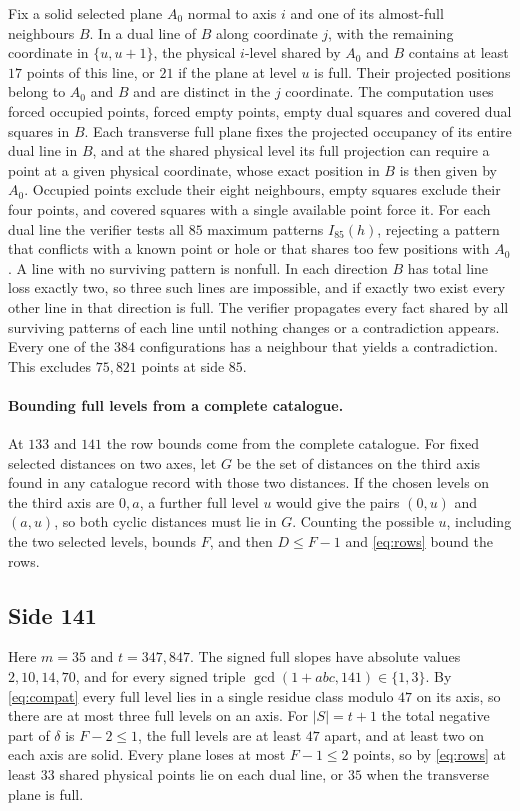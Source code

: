 \documentclass[11pt,colorlinks]{charlie}
\begin{document}
Fix a solid selected plane $A_0$ normal to axis $i$ and one of its almost-full neighbours $B$. In a dual line of $B$ along coordinate $j$, with the remaining coordinate in $\{u,u+1\}$, the physical $i$-level shared by $A_0$ and $B$ contains at least $17$ points of this line, or $21$ if the plane at level $u$ is full. Their projected positions belong to $A_0$ and $B$ and are distinct in the $j$ coordinate. The computation uses forced occupied points, forced empty points, empty dual squares and covered dual squares in $B$. Each transverse full plane fixes the projected occupancy of its entire dual line in $B$, and at the shared physical level its full projection can require a point at a given physical coordinate, whose exact position in $B$ is then given by $A_0$. Occupied points exclude their eight neighbours, empty squares exclude their four points, and covered squares with a single available point force it. For each dual line the verifier tests all $85$ maximum patterns $I_{85}(h)$, rejecting a pattern that conflicts with a known point or hole or that shares too few positions with $A_0$. A line with no surviving pattern is nonfull. In each direction $B$ has total line loss exactly two, so three such lines are impossible, and if exactly two exist every other line in that direction is full. The verifier propagates every fact shared by all surviving patterns of each line until nothing changes or a contradiction appears. Every one of the $384$ configurations has a neighbour that yields a contradiction. This excludes $75{,}821$ points at side $85$.

\paragraph{Bounding full levels from a complete catalogue.}
At $133$ and $141$ the row bounds come from the complete catalogue. For fixed selected distances on two axes, let $G$ be the set of distances on the third axis found in any catalogue record with those two distances. If the chosen levels on the third axis are $0,a$, a further full level $u$ would give the pairs $(0,u)$ and $(a,u)$, so both cyclic distances must lie in $G$. Counting the possible $u$, including the two selected levels, bounds $F$, and then $D\le F-1$ and \eqref{eq:rows} bound the rows.

\subsection{Side 141}
Here $m=35$ and $t=347{,}847$. The signed full slopes have absolute values $2,10,14,70$, and for every signed triple $\gcd(1+abc,141)\in\{1,3\}$. By \eqref{eq:compat} every full level lies in a single residue class modulo $47$ on its axis, so there are at most three full levels on an axis. For $|S|=t+1$ the total negative part of $\delta$ is $F-2\le1$, the full levels are at least $47$ apart, and at least two on each axis are solid. Every plane loses at most $F-1\le2$ points, so by \eqref{eq:rows} at least $33$ shared physical points lie on each dual line, or $35$ when the transverse plane is full.
\end{document}
